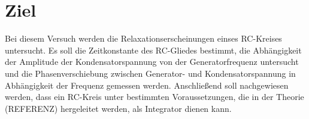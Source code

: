 \section{Ziel}
Bei diesem Versuch werden die Relaxationserscheinungen
einses RC-Kreises untersucht.
Es soll die Zeitkonstante des RC-Gliedes bestimmt,
die Abhängigkeit der Amplitude der
Kondensatorspannung  von der Generatorfrequenz
untersucht und die Phasenverschiebung zwischen
Generator- und Kondensatorspannung in Abhängigkeit
der Frequenz gemessen werden.
Anschließend soll nachgewiesen werden, dass ein
RC-Kreis unter bestimmten Voraussetzungen, die
in der Theorie (REFERENZ) hergeleitet werden, als 
Integrator dienen kann.